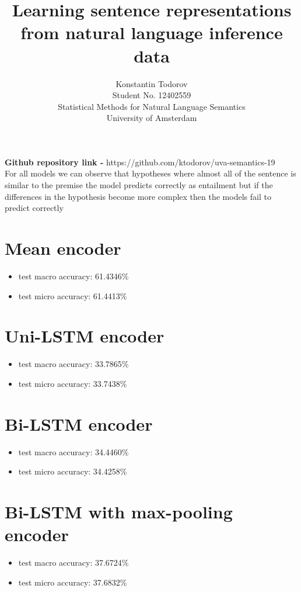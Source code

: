 \documentclass[8pt]{article}
\title{
  Learning sentence representations from natural language inference data}
\author{%
  Konstantin Todorov \\
  Student No. 12402559 \\
  Statistical Methods for Natural Language Semantics\\
  University of Amsterdam\\
}
\begin{document}
\maketitle

\textbf{Github repository link - } https://github.com/ktodorov/uva-semantics-19\\

For all models we can observe that hypotheses where almost all of the sentence 
is similar to the premise the model predicts correctly as entailment but if
the differences in the hypothesis become more complex then the models fail
to predict correctly

\section{Mean encoder}

\begin{itemize}
  \item test macro accuracy: 61.4346\%
  
  \item test micro accuracy: 61.4413\%
\end{itemize}

\section{Uni-LSTM encoder}

\begin{itemize}
  \item test macro accuracy: 33.7865\%
  
  \item test micro accuracy: 33.7438\%
\end{itemize}

\section{Bi-LSTM encoder}

\begin{itemize}
  \item test macro accuracy: 34.4460\%
  
  \item test micro accuracy: 34.4258\%
\end{itemize}

\section{Bi-LSTM with max-pooling encoder}

\begin{itemize}
  \item test macro accuracy: 37.6724\%
  
  \item test micro accuracy: 37.6832\%
\end{itemize}
\end{document}
